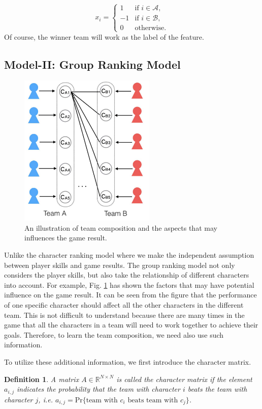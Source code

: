\documentclass{article} %
\newtheorem{definition}{Definition}
\begin{document}
\begin{equation}
x_i =
\begin{cases}
1 &  \text{if $i\in \mathcal{A},$} \\
-1 &  \text{if $i\in \mathcal{B},$} \\
0 & \text{otherwise.}
\end{cases}
\end{equation}
Of course, the winner team will work as the label of the feature.


\subsection{Model-II: Group Ranking Model}

\begin{figure}[t]
  \centering
    \includegraphics[width=65mm]{team_comp.pdf}
  \caption{An illustration of team composition and the aspects that may influences the game result.}
  \label{fig:team_comp}
\end{figure}

Unlike the character ranking model where we make the independent assumption between player skills and game results. The group ranking model not only considers the player skills, but also take the relationship of different characters into account. For example, Fig. \ref{fig:team_comp} has shown the factors that may have potential influence on the game result. It can be seen from the figure that the performance of one specific character should affect all the other characters in the different team. This is not difficult to understand because there are many times in the game that all the characters in a team will need to work together to achieve their goals. Therefore, to learn the team composition, we need also use such information.

To utilize these additional information, we first introduce the character matrix.
\begin{definition}
A matrix $A \in \mathbb{R}^{N\times N}$ is called the character matrix if the element $a_{i,j}$ indicates the probability that the team with character $i$ beats the team with character $j$, i.e. $a_{i,j}=\text{Pr}\{\text{team with $c_i$ beats team with $c_j$}\}$.
\end{definition}
\end{document}
